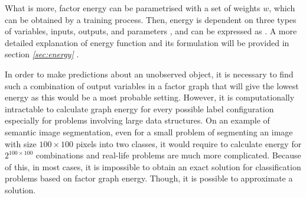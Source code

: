 What is more, factor energy can be parametrised with a set of weights $w$, which can be obtained by a training process. Then, energy is dependent on three types of variables, inputs, outputs, and parameters \cite{inference_crf}, and can be expressed as . A more detailed explanation of energy function and its formulation will be provided in section \textit{\ref{sec:energy} }.

In order to make predictions about an unobserved object, it is necessary to find such a combination of output variables in a factor graph that will give the lowest energy as this would be a most probable setting. However, it is computationally intractable to calculate graph energy for every possible label configuration especially for problems involving large data structures. On an example of semantic image segmentation, even for a small problem of segmenting an image with size $100\times100$ pixels into two classes, it would require to calculate energy for $2^{100\times100}$ combinations and real-life problems are much more complicated. Because of this, in most cases, it is impossible to obtain an exact solution for classification problems based on factor graph energy. Though, it is possible to approximate a solution.